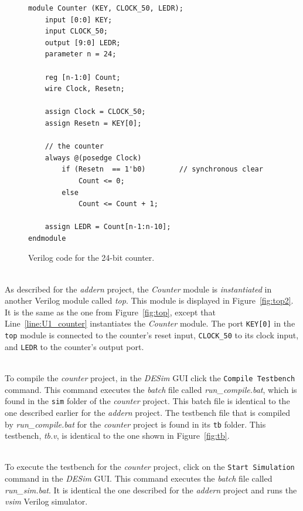 \documentclass[epsfig,10pt,fullpage]{article} \addtolength{\textwidth}{1.5in}
\begin{document}
\lstset{language=Verilog,numbers=none,escapechar=?}
\begin{figure}[h]
\begin{center}
\begin{minipage}[t]{12.5 cm}
\begin{lstlisting}[name=accumulate]
module Counter (KEY, CLOCK_50, LEDR);
    input [0:0] KEY;
    input CLOCK_50;
    output [9:0] LEDR;
    parameter n = 24;
   
    reg [n-1:0] Count;
    wire Clock, Resetn;

    assign Clock = CLOCK_50;
    assign Resetn = KEY[0];

    // the counter
    always @(posedge Clock)
        if (Resetn  == 1'b0)        // synchronous clear
            Count <= 0;
        else
            Count <= Count + 1;

    assign LEDR = Count[n-1:n-10];
endmodule
\end{lstlisting}
\end{minipage}
\caption{Verilog code for the 24-bit counter.}
\label{fig:counter}
\end{center}
\end{figure}

~\\
\noindent
As described for the {\it addern} project, the {\it Counter} module is {\it instantiated}
in another Verilog module called {\it top}. This module is displayed in 
Figure~\ref{fig:top2}. It is the same as the one from Figure~\ref{fig:top}, except that 
Line~\ref{line:U1_counter} instantiates the {\it Counter} module.
The port \texttt{KEY[0]} in the \texttt{top}
module is connected to the counter's reset input, \texttt{CLOCK\_50} to its clock input, 
and \texttt{LEDR} to the counter's output port. 

~\\
\noindent
To compile the {\it counter} project, in the {\it DESim} GUI click the \texttt{Compile Testbench}
command. This command executes the {\it batch} file called {\it run\_compile.bat}, which
is found in the \texttt{sim} folder of the {\it counter} project. This batch file 
is identical to the one described earlier for the {\it addern} project. 
The testbench file that is compiled by {\it run\_compile.bat} for the {\it counter} project is  
found in its \texttt{tb} folder. This testbench, {\it tb.v}, is identical to the one shown 
in Figure~\ref{fig:tb}.

~\\
To execute the testbench for the {\it counter} project, click on the
\texttt{Start Simulation} command in the {\it DESim} GUI. This command executes the
{\it batch} file called {\it run\_sim.bat}. It is identical the one described for the 
{\it addern} project and runs the {\it vsim} Verilog simulator.
\end{document}
